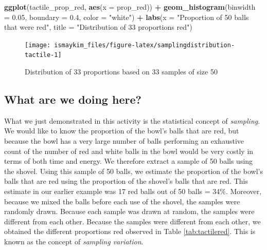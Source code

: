 \documentclass[12pt, krantz2,]{krantz}
\makeatletter
\newenvironment{Shaded}{\begin{snugshade}}{\end{snugshade}}
\newcommand{\DataTypeTok}[1]{\textcolor[rgb]{0.27,0.27,0.27}{#1}}
\newcommand{\FloatTok}[1]{\textcolor[rgb]{0.06,0.06,0.06}{#1}}
\newcommand{\KeywordTok}[1]{\textcolor[rgb]{0.27,0.27,0.27}{\textbf{#1}}}
\newcommand{\NormalTok}[1]{#1}
\newcommand{\OperatorTok}[1]{\textcolor[rgb]{0.43,0.43,0.43}{\textbf{#1}}}
\newcommand{\StringTok}[1]{\textcolor[rgb]{0.5,0.5,0.5}{#1}}
\newenvironment{kframe}{%
\medskip{}
\setlength{\fboxsep}{.8em}
 \def\at@end@of@kframe{}%
 \ifinner\ifhmode%
  \def\at@end@of@kframe{\end{minipage}}%
  \begin{minipage}{\columnwidth}%
 \fi\fi%
 \def\FrameCommand##1{\hskip\@totalleftmargin \hskip-\fboxsep
 \colorbox{shadecolor}{##1}\hskip-\fboxsep
     \hskip-\linewidth \hskip-\@totalleftmargin \hskip\columnwidth}%
 \MakeFramed {\advance\hsize-\width
   \@totalleftmargin\z@ \linewidth\hsize
   \@setminipage}}%
 {\par\unskip\endMakeFramed%
 \at@end@of@kframe}
\renewenvironment{Shaded}{\begin{kframe}}{\end{kframe}}
\makeatother
\begin{document}
\begin{Shaded}
\begin{Highlighting}[]
\KeywordTok{ggplot}\NormalTok{(tactile_prop_red, }\KeywordTok{aes}\NormalTok{(}\DataTypeTok{x =}\NormalTok{ prop_red)) }\OperatorTok{+}
\StringTok{  }\KeywordTok{geom_histogram}\NormalTok{(}\DataTypeTok{binwidth =} \FloatTok{0.05}\NormalTok{, }\DataTypeTok{boundary =} \FloatTok{0.4}\NormalTok{, }\DataTypeTok{color =} \StringTok{"white"}\NormalTok{) }\OperatorTok{+}
\StringTok{  }\KeywordTok{labs}\NormalTok{(}\DataTypeTok{x =} \StringTok{"Proportion of 50 balls that were red"}\NormalTok{, }
       \DataTypeTok{title =} \StringTok{"Distribution of 33 proportions red"}\NormalTok{) }
\end{Highlighting}
\end{Shaded}

\begin{figure}

{\centering \texttt{[image: ismaykim\_files/figure-latex/samplingdistribution-tactile-1]} 

}

\caption{Distribution of 33 proportions based on 33 samples of size 50}\label{fig:samplingdistribution-tactile}
\end{figure}

\hypertarget{what-are-we-doing-here}{%
\subsection{What are we doing here?}\label{what-are-we-doing-here}}

What we just demonstrated in this activity is the statistical concept of \emph{sampling}. We would like to know the proportion of the bowl's balls that are red, but because the bowl has a very large number of balls performing an exhaustive count of the number of red and white balls in the bowl would be very costly in terms of both time and energy. We therefore extract a sample of 50 balls using the shovel. Using this sample of 50 balls, we estimate the proportion of the bowl's balls that are red using the proportion of the shovel's balls that are red. This estimate in our earlier example was 17 red balls out of 50 balls = 34\%. Moreover, because we mixed the balls before each use of the shovel, the samples were randomly drawn. Because each sample was drawn at random, the samples were different from each other. Because the samples were different from each other, we obtained the different proportions red observed in Table \ref{tab:tactilered}. This is known as the concept of \emph{sampling variation}.
\end{document}
